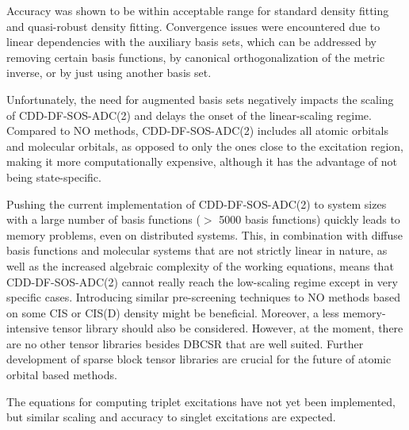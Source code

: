 Accuracy was shown to be within acceptable range for standard density fitting and quasi-robust density fitting. Convergence issues were encountered due to linear dependencies with the auxiliary basis sets, which can be addressed by removing certain basis functions, by canonical orthogonalization of the metric inverse, or by just using another basis set. 

Unfortunately, the need for augmented basis sets negatively impacts the scaling of CDD-DF-SOS-ADC(2) and delays the onset of the linear-scaling regime. Compared to NO methods, CDD-DF-SOS-ADC(2) includes all atomic orbitals and molecular orbitals, as opposed to only the ones close to the excitation region, making it more computationally expensive, although it has the advantage of not being state-specific. 

Pushing the current implementation of CDD-DF-SOS-ADC(2) to system sizes with a large number of basis functions ($>$ 5000 basis functions) quickly leads to memory problems, even on distributed systems. This, in combination with diffuse basis functions and molecular systems that are not strictly linear in nature, as well as the increased algebraic complexity of the working equations, means that CDD-DF-SOS-ADC(2) cannot really reach the low-scaling regime except in very specific cases. Introducing similar pre-screening techniques to NO methods based on some CIS or CIS(D) density might be beneficial. Moreover, a less memory-intensive tensor library should also be considered. However, at the moment, there are no other tensor libraries besides DBCSR that are well suited. Further development of sparse block tensor libraries are crucial for the future of atomic orbital based methods.

The equations for computing triplet excitations have not yet been implemented, but similar scaling and accuracy to singlet excitations are expected. 
